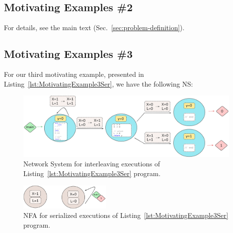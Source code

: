 %

\subsection{Motivating Examples \#2}
\label{appendix:subsec::Ex1B:NS}

For details, see the main text (Sec.~\ref{sec:problem-definition}).


\subsection{Motivating Examples \#3}
\label{appendix:subsec:Ex1C:NS}

For our third motivating example, presented in Listing~\ref{lst:MotivatingExample3Ser}, we have the following NS:

%		
%		
%

\begin{figure}[!htbp]
	\centering
	\includegraphics[width=1.1\textwidth]{plots/code_3_NS.png}
	\caption{Network System for interleaving executions of Listing~\ref{lst:MotivatingExample3Ser} program.}
	\label{fig:code3ExampleNS}
\end{figure}


\begin{figure}[!htbp]
	\centering
	\includegraphics[width=0.4\textwidth]{plots/code_3_NFA.png}
	\caption{NFA for serialized executions of Listing~\ref{lst:MotivatingExample3Ser} program.}
	\label{fig:code3ExampleNFA}
\end{figure}



